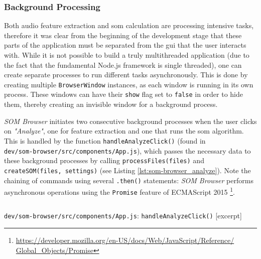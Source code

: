 \subsubsection{Background Processing}
\label{subsubsec:som-browser_background_processing}
Both audio feature extraction and \gls{som} calculation are processing intensive
tasks, therefore it was clear from the beginning of the development stage that
these parts of the application must be separated from the \gls{gui} that the
user interacts with. While it is not possible to build a truly multithreaded
application (due to the fact that the fundamental Node.js framework is single
threaded), one can create separate processes to run different tasks
asynchronously. This is done by creating multiple \texttt{BrowserWindow}
instances, as each window is running in its own process. These windows can have
their \texttt{show} flag set to \texttt{false} in order to hide
them, thereby creating an invisible window for a background process.

\smallskip

\textit{SOM Browser} initiates two consecutive background processes when the
user clicks on \textit{"Analyze"}, one for feature extraction and one that runs
the \gls{som} algorithm. This is handled by the function
\texttt{handleAnalyzeClick()} (found in \\
\texttt{dev/som-browser/src/components/App.js}), which passes the necessary data
to these background processes by calling \texttt{processFiles(files)}
and \\
\texttt{createSOM(files, settings)} (see Listing
\ref{lst:som-browser_analyze}). Note the chaining of commands using several
\texttt{.then()} statements: \textit{SOM Browser} performs asynchronous
operations using the \texttt{Promise} feature of ECMAScript 2015
\footnote{\href{https://developer.mozilla.org/en-US/docs/Web/JavaScript/Reference/Global\_Objects/Promise}
{https://developer.mozilla.org/en-US/docs/Web/JavaScript/Reference/ \\
Global\_Objects/Promise}}.

\begin{listing}[!htb]
  \begin{mdframed}
    \inputminted[breaklines, numbers=left, firstline=284, lastline=293,
    fontsize=\footnotesize]{jsx}{../dev/som-browser/src/components/App.js}
  \end{mdframed}
  \caption{\texttt{dev/som-browser/src/components/App.js}:
  \texttt{handleAnalyzeClick()} [excerpt]}
  \label{lst:som-browser_analyze}
\end{listing}

